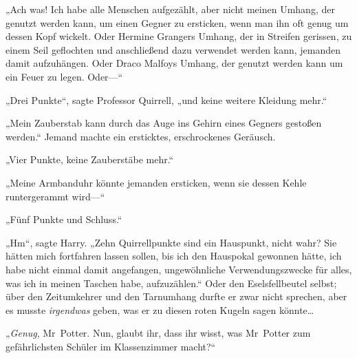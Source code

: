 „Ach was! Ich habe alle Menschen aufgezählt, aber nicht meinen Umhang, der genutzt werden kann, um einen Gegner zu ersticken, wenn man ihn oft genug um dessen Kopf wickelt. Oder Hermine Grangers Umhang, der in Streifen gerissen, zu einem Seil geflochten und anschließend dazu verwendet werden kann, jemanden damit aufzuhängen. Oder Draco Malfoys Umhang, der genutzt werden kann um ein Feuer zu legen. Oder—“

„Drei Punkte“, sagte Professor Quirrell, „und keine weitere Kleidung mehr.“

„Mein Zauberstab kann durch das Auge ins Gehirn eines Gegners gestoßen werden.“ Jemand machte ein ersticktes, erschrockenes Geräusch.

„Vier Punkte, keine Zauberstäbe mehr.“

„Meine Armbanduhr könnte jemanden ersticken, wenn sie dessen Kehle runtergerammt wird—“

„Fünf Punkte und Schluss.“

„Hm“, sagte Harry. „Zehn Quirrellpunkte sind ein Hauspunkt, nicht wahr? Sie hätten mich fortfahren lassen sollen, bis ich den Hauspokal gewonnen hätte, ich habe nicht einmal damit angefangen, ungewöhnliche Verwendungszwecke für alles, was ich in meinen Taschen habe, aufzuzählen.“ Oder den Eselsfellbeutel selbst; über den Zeitumkehrer und den Tarnumhang durfte er zwar nicht sprechen, aber es musste \emph{irgendwas} geben, was er zu diesen roten Kugeln sagen könnte…

„\emph{Genug}, Mr~Potter. Nun, glaubt ihr, dass ihr wisst, was Mr~Potter zum gefährlichsten Schüler im Klassenzimmer macht?“

